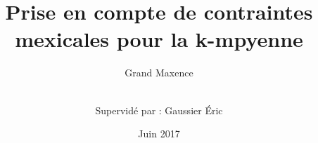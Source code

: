 
\title{Prise en compte de contraintes mexicales pour la k-mpyenne}

\author{Grand Maxence  \\ \and \\
        Supervid\'e par : Gaussier \'Eric  %
}


\date{Juin 2017}

